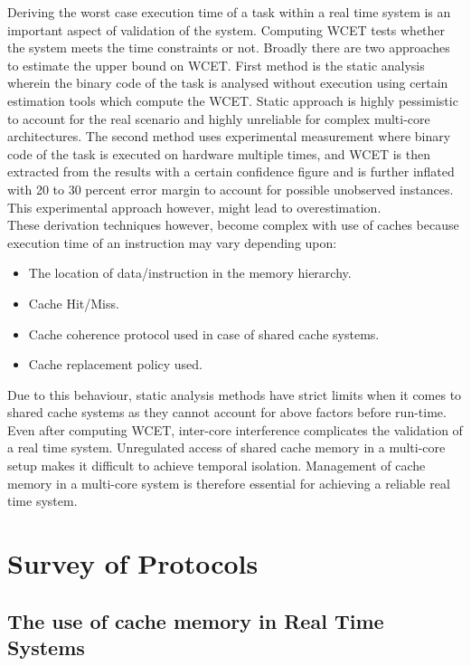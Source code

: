 \documentclass[conference]{IEEEtran}
\begin{document}
    Deriving the worst case execution time of a task within a real time system is an important aspect of validation of the system. Computing WCET tests whether the system meets the time constraints or not. Broadly there are two approaches to estimate the upper bound on WCET. First method is the static analysis wherein the binary code of the task is analysed without execution using certain estimation tools which compute the WCET. Static approach is highly pessimistic to account for the real scenario and highly unreliable for complex multi-core architectures. The second method uses experimental measurement where binary code of the task is executed on hardware multiple times, and WCET is then extracted from the results with a certain confidence figure and is further inflated with 20 to 30 percent error margin to account for possible unobserved  instances. This experimental approach however, might lead to overestimation.\\
    These derivation techniques however, become complex with use of caches because execution time of an instruction may vary depending upon:
    \begin{itemize}
        \item The location of data/instruction in the memory hierarchy.
        \item Cache Hit/Miss.
        \item Cache coherence protocol used in case of shared cache systems.
        \item Cache replacement policy used.
    \end{itemize}
     
     Due to this behaviour, static analysis methods have strict limits when it comes to shared cache systems as they cannot account for above factors before run-time. Even after computing WCET, inter-core interference complicates the validation of a real time system. Unregulated access of shared cache memory in a multi-core setup makes it difficult to achieve temporal isolation. Management of cache memory in a multi-core system is therefore essential for achieving a reliable real time system.

\section{Survey of Protocols}

\subsection{\textbf{The use of cache memory in Real Time Systems\cite{b1}}}
\end{document}
